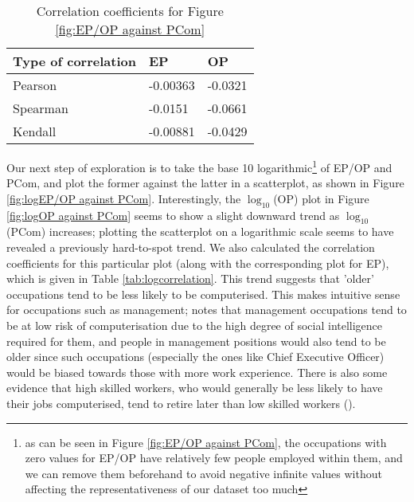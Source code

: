 \documentclass[11pt]{article}
\begin{document}
\begin{table}[]
	\centering
	\begin{tabular}{l|ll|ll}
	\textbf{Type of correlation} & \multicolumn{2}{l|}{\textbf{EP}} & \multicolumn{2}{l}{\textbf{OP}} \\ \hline
	Pearson                      & \multicolumn{2}{l|}{-0.00363}     & \multicolumn{2}{l}{-0.0321}      \\ \hline
	Spearman                     & \multicolumn{2}{l|}{-0.0151}      & \multicolumn{2}{l}{-0.0661}    \\ \hline
	Kendall                      & \multicolumn{2}{l|}{-0.00881}      & \multicolumn{2}{l}{-0.0429}   
	\end{tabular}
	\caption{Correlation coefficients for Figure \ref{fig:EP/OP against PCom}}
	\label{tab:correlation}
	\end{table}


Our next step of exploration is to take the base 10 logarithmic\footnote{as can be seen in Figure \ref{fig:EP/OP against PCom}, the occupations with zero values for EP/OP have relatively few people employed within them, and we can remove them beforehand to avoid negative infinite values without affecting the representativeness of our dataset too much} of EP/OP and PCom, and plot the former against the latter in a scatterplot, as shown in Figure \ref{fig:logEP/OP against PCom}. Interestingly, the $\log_{10}$(OP) plot in Figure \ref{fig:logOP against PCom} seems to show a slight downward trend as $\log_{10}$(PCom) increases; plotting the scatterplot on a logarithmic scale seems to have revealed a previously hard-to-spot trend. We also calculated the correlation coefficients for this particular plot (along with the corresponding plot for EP), which is given in Table \ref{tab:logcorrelation}. This trend suggests that 'older' occupations tend to be less likely to be computerised. This makes intuitive sense for occupations such as management; \cite{osborne2017future} notes that management occupations tend to be at low risk of computerisation due to the high degree of social intelligence required for them, and people in management positions would also tend to be older since such occupations (especially the ones like Chief Executive Officer) would be biased towards those with more work experience. There is also some evidence that high skilled workers, who would generally be less likely to have their jobs computerised, tend to retire later than low skilled workers (\cite{HimmelreicherRalfK.2009Saao}).
\end{document}
